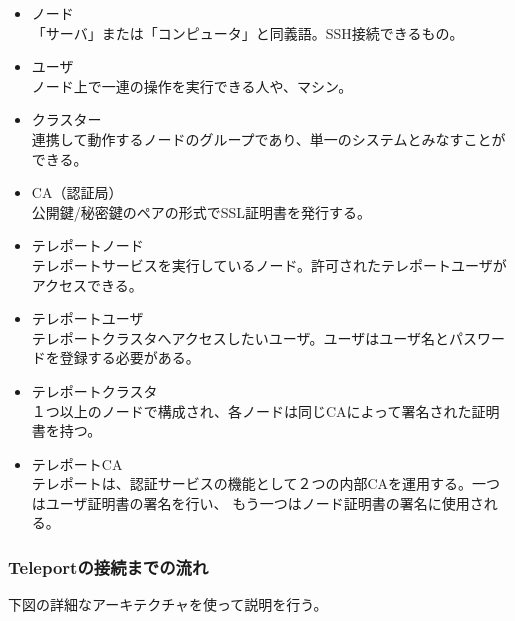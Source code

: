 \documentclass[12pt,a4paper,titlepage]{jsarticle}
\begin{document}
        
\begin{itemize}
    \item ノード\mbox{}\\「サーバ」または「コンピュータ」と同義語。SSH接続できるもの。
    \item ユーザ\mbox{}\\ノード上で一連の操作を実行できる人や、マシン。
    \item クラスター\mbox{}\\連携して動作するノードのグループであり、単一のシステムとみなすことができる。
    \item CA（認証局）\mbox{}\\公開鍵/秘密鍵のペアの形式でSSL証明書を発行する。
    \item テレポートノード\mbox{}\\テレポートサービスを実行しているノード。許可されたテレポートユーザがアクセスできる。
    \item テレポートユーザ\mbox{}\\テレポートクラスタへアクセスしたいユーザ。ユーザはユーザ名とパスワードを登録する必要がある。
    \item テレポートクラスタ\mbox{}\\１つ以上のノードで構成され、各ノードは同じCAによって署名された証明書を持つ。
    
    \item テレポートCA\mbox{}\\テレポートは、認証サービスの機能として２つの内部CAを運用する。一つはユーザ証明書の署名を行い、
    もう一つはノード証明書の署名に使用される。

    
\end{itemize}

\subsubsection*{Teleportの接続までの流れ}
下図の詳細なアーキテクチャを使って説明を行う。
\end{document}
